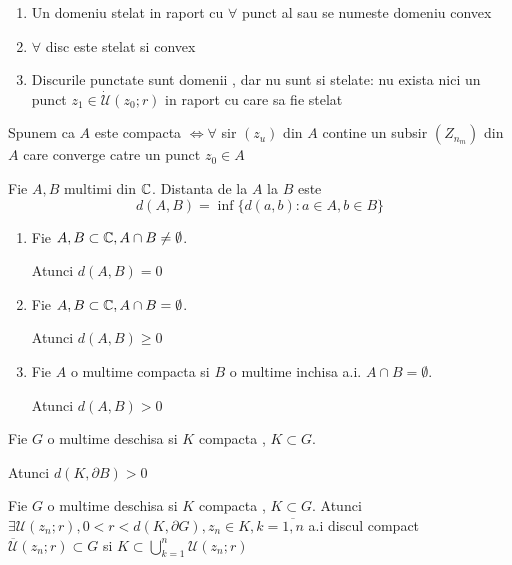 \begin{observation}\leavevmode
	\begin{enumerate}
		\item Un domeniu stelat in raport cu $\forall$ punct al sau se numeste
		 domeniu convex
		\item $\forall$ disc este stelat si convex
		\item Discurile punctate sunt domenii , dar nu sunt si stelate: nu exista
		 nici un punct $z_1 \in \dot{\mathcal{U}}(z_0;r)$ in raport cu care sa fie stelat
	\end{enumerate}
\end{observation}

\begin{definition}
	Spunem ca $A$ este compacta $\iff \forall$ sir $(z_u)$ din $A$ contine un
	subsir $(Z_{n_m})$ din $A$ care converge catre un punct $z_0 \in A$
\end{definition}

\begin{definition}
	Fie $A, B$ multimi din $\mathbb{C}$. Distanta de la $A$ la $B$ este
	\begin{equation}
		d(A,B) = \inf\{d(a,b)\colon a \in A , b \in B \}
	\end{equation}
\end{definition}

\begin{observation}\leavevmode
\begin{enumerate}
	\item Fie $A, B \subset \mathbb{C}, A \cap B \neq \emptyset$.

	Atunci $d(A, B) = 0$

	\item Fie $A, B \subset \mathbb{C}, A \cap B = \emptyset$.

	Atunci $d(A, B) \geq 0$

	\item Fie $A$ o multime compacta si $B$ o multime inchisa a.i. $A \cap B = \emptyset$.

	Atunci $d(A, B) > 0$
\end{enumerate}
\end{observation}

\begin{consequence}
	Fie $G$ o multime deschisa si $K$ compacta , $K\subset G$.

	Atunci $d(K,\partial B)>0$
\end{consequence}

\begin{consequence}
	Fie $G$ o multime deschisa si $K$ compacta , $K\subset G$.
	Atunci $\exists \mathcal{U}(z_n;r), 0 < r < d(K, \partial G) ,
	z_n \in K , k = \overline{1,n}$ a.i discul compact
	$\overline{\mathcal{U}}(z_n;r) \subset G$ si $K \subset \bigcup_{k=1}^{n} \mathcal{U}(z_n;r)$
\end{consequence}